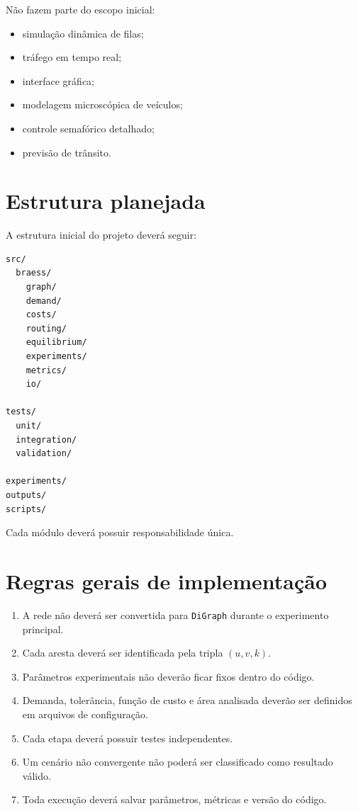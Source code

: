 \documentclass[12pt,a4paper]{article}
\begin{document}
Não fazem parte do escopo inicial:

\begin{itemize}
    \item simulação dinâmica de filas;
    \item tráfego em tempo real;
    \item interface gráfica;
    \item modelagem microscópica de veículos;
    \item controle semafórico detalhado;
    \item previsão de trânsito.
\end{itemize}

\section{Estrutura planejada}

A estrutura inicial do projeto deverá seguir:

\begin{verbatim}
src/
  braess/
    graph/
    demand/
    costs/
    routing/
    equilibrium/
    experiments/
    metrics/
    io/

tests/
  unit/
  integration/
  validation/

experiments/
outputs/
scripts/
\end{verbatim}

Cada módulo deverá possuir responsabilidade única.

\section{Regras gerais de implementação}

\begin{enumerate}
    \item A rede não deverá ser convertida para \texttt{DiGraph} durante o
    experimento principal.
    
    \item Cada aresta deverá ser identificada pela tripla
    \((u,v,k)\).
    
    \item Parâmetros experimentais não deverão ficar fixos dentro do código.
    
    \item Demanda, tolerância, função de custo e área analisada deverão ser
    definidos em arquivos de configuração.
    
    \item Cada etapa deverá possuir testes independentes.
    
    \item Um cenário não convergente não poderá ser classificado como resultado
    válido.
    
    \item Toda execução deverá salvar parâmetros, métricas e versão do código.
\end{enumerate}
\end{document}
